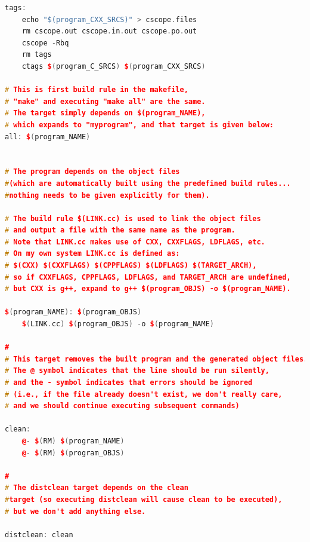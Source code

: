\documentclass[a4paper,11pt,twoside]{book}
\begin{document}
\begin{itemize}
\begin{lstlisting}[frame=single,  basicstyle=\small, language=c++, mathescape=false]
tags:
	echo "$(program_CXX_SRCS)" > cscope.files 
	rm cscope.out cscope.in.out cscope.po.out 
    cscope -Rbq 
	rm tags
	ctags $(program_C_SRCS) $(program_CXX_SRCS)
	 
# This is first build rule in the makefile, 
# "make" and executing "make all" are the same.
# The target simply depends on $(program_NAME), 
# which expands to "myprogram", and that target is given below:
all: $(program_NAME)


# The program depends on the object files 
#(which are automatically built using the predefined build rules... 
#nothing needs to be given explicitly for them).

# The build rule $(LINK.cc) is used to link the object files
# and output a file with the same name as the program. 
# Note that LINK.cc makes use of CXX, CXXFLAGS, LDFLAGS, etc.
# On my own system LINK.cc is defined as: 
# $(CXX) $(CXXFLAGS) $(CPPFLAGS) $(LDFLAGS) $(TARGET_ARCH),
# so if CXXFLAGS, CPPFLAGS, LDFLAGS, and TARGET_ARCH are undefined,
# but CXX is g++, expand to g++ $(program_OBJS) -o $(program_NAME).

$(program_NAME): $(program_OBJS)
    $(LINK.cc) $(program_OBJS) -o $(program_NAME)

#
# This target removes the built program and the generated object files. 
# The @ symbol indicates that the line should be run silently, 
# and the - symbol indicates that errors should be ignored 
# (i.e., if the file already doesn't exist, we don't really care, 
# and we should continue executing subsequent commands)

clean:
    @- $(RM) $(program_NAME)
    @- $(RM) $(program_OBJS)

#
# The distclean target depends on the clean
#target (so executing distclean will cause clean to be executed), 
# but we don't add anything else.

distclean: clean
\end{lstlisting}

\end{itemize}
\end{document}
